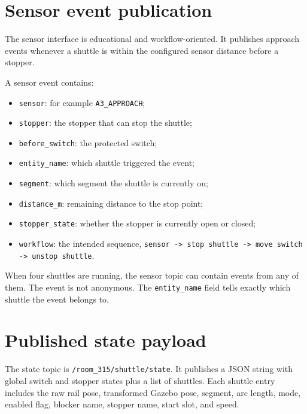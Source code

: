 \documentclass[12pt,a4paper]{report}
\newcommand{\codenext}[1]{\par\Needspace{#1\baselineskip}}
\begin{document}
\section{Sensor event publication}

The sensor interface is educational and workflow-oriented. It publishes
approach events whenever a shuttle is within the configured sensor distance
before a stopper.

\codenext{28}


A sensor event contains:

\begin{itemize}
\item \texttt{sensor}: for example \texttt{A3\_APPROACH};
\item \texttt{stopper}: the stopper that can stop the shuttle;
\item \texttt{before\_switch}: the protected switch;
\item \texttt{entity\_name}: which shuttle triggered the event;
\item \texttt{segment}: which segment the shuttle is currently on;
\item \texttt{distance\_m}: remaining distance to the stop point;
\item \texttt{stopper\_state}: whether the stopper is currently open or closed;
\item \texttt{workflow}: the intended sequence,
\texttt{sensor -> stop shuttle -> move switch -> unstop shuttle}.
\end{itemize}

When four shuttles are running, the sensor topic can contain events from any of
them. The event is not anonymous. The \texttt{entity\_name} field tells exactly
which shuttle the event belongs to.

\section{Published state payload}

The state topic is \texttt{/room\_315/shuttle/state}. It publishes a JSON string
with global switch and stopper states plus a list of shuttles. Each shuttle
entry includes the raw rail pose, transformed Gazebo pose, segment, arc length,
mode, enabled flag, blocker name, stopper name, start slot, and speed.
\end{document}

